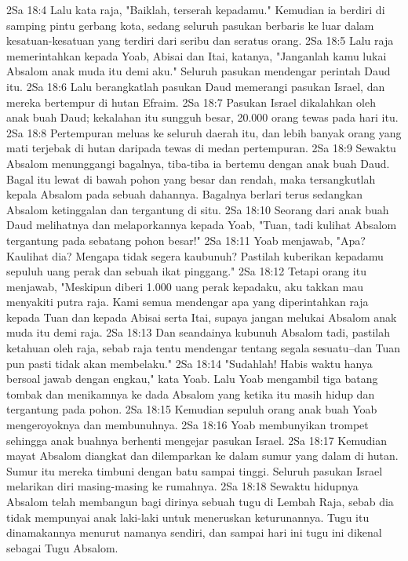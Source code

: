 2Sa 18:4  Lalu kata raja, "Baiklah, terserah kepadamu." Kemudian ia berdiri di samping pintu gerbang kota, sedang seluruh pasukan berbaris ke luar dalam kesatuan-kesatuan yang terdiri dari seribu dan seratus orang.
2Sa 18:5  Lalu raja memerintahkan kepada Yoab, Abisai dan Itai, katanya, "Janganlah kamu lukai Absalom anak muda itu demi aku." Seluruh pasukan mendengar perintah Daud itu.
2Sa 18:6  Lalu berangkatlah pasukan Daud memerangi pasukan Israel, dan mereka bertempur di hutan Efraim.
2Sa 18:7  Pasukan Israel dikalahkan oleh anak buah Daud; kekalahan itu sungguh besar, 20.000 orang tewas pada hari itu.
2Sa 18:8  Pertempuran meluas ke seluruh daerah itu, dan lebih banyak orang yang mati terjebak di hutan daripada tewas di medan pertempuran.
2Sa 18:9  Sewaktu Absalom menunggangi bagalnya, tiba-tiba ia bertemu dengan anak buah Daud. Bagal itu lewat di bawah pohon yang besar dan rendah, maka tersangkutlah kepala Absalom pada sebuah dahannya. Bagalnya berlari terus sedangkan Absalom ketinggalan dan tergantung di situ.
2Sa 18:10  Seorang dari anak buah Daud melihatnya dan melaporkannya kepada Yoab, "Tuan, tadi kulihat Absalom tergantung pada sebatang pohon besar!"
2Sa 18:11  Yoab menjawab, "Apa? Kaulihat dia? Mengapa tidak segera kaubunuh? Pastilah kuberikan kepadamu sepuluh uang perak dan sebuah ikat pinggang."
2Sa 18:12  Tetapi orang itu menjawab, "Meskipun diberi 1.000 uang perak kepadaku, aku takkan mau menyakiti putra raja. Kami semua mendengar apa yang diperintahkan raja kepada Tuan dan kepada Abisai serta Itai, supaya jangan melukai Absalom anak muda itu demi raja.
2Sa 18:13  Dan seandainya kubunuh Absalom tadi, pastilah ketahuan oleh raja, sebab raja tentu mendengar tentang segala sesuatu--dan Tuan pun pasti tidak akan membelaku."
2Sa 18:14  "Sudahlah! Habis waktu hanya bersoal jawab dengan engkau," kata Yoab. Lalu Yoab mengambil tiga batang tombak dan menikamnya ke dada Absalom yang ketika itu masih hidup dan tergantung pada pohon.
2Sa 18:15  Kemudian sepuluh orang anak buah Yoab mengeroyoknya dan membunuhnya.
2Sa 18:16  Yoab membunyikan trompet sehingga anak buahnya berhenti mengejar pasukan Israel.
2Sa 18:17  Kemudian mayat Absalom diangkat dan dilemparkan ke dalam sumur yang dalam di hutan. Sumur itu mereka timbuni dengan batu sampai tinggi. Seluruh pasukan Israel melarikan diri masing-masing ke rumahnya.
2Sa 18:18  Sewaktu hidupnya Absalom telah membangun bagi dirinya sebuah tugu di Lembah Raja, sebab dia tidak mempunyai anak laki-laki untuk meneruskan keturunannya. Tugu itu dinamakannya menurut namanya sendiri, dan sampai hari ini tugu ini dikenal sebagai Tugu Absalom.
